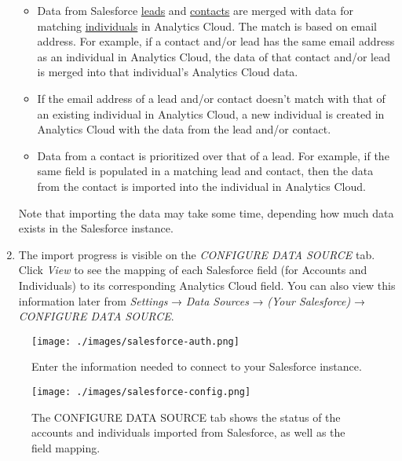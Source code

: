 \begin{enumerate}
  \begin{itemize}
  \tightlist
  \item
    Data from Salesforce
    \href{https://help.salesforce.com/articleView?id=leads_def.htm&type=5}{leads}
    and
    \href{https://help.salesforce.com/articleView?id=contacts_overview.htm&type=5}{contacts}
    are merged with data for matching
    \href{https://help.liferay.com/hc/en-us/articles/360006946171-Profiling-Individuals}{individuals}
    in Analytics Cloud. The match is based on email address. For
    example, if a contact and/or lead has the same email address as an
    individual in Analytics Cloud, the data of that contact and/or lead
    is merged into that individual's Analytics Cloud data.
  \item
    If the email address of a lead and/or contact doesn't match with
    that of an existing individual in Analytics Cloud, a new individual
    is created in Analytics Cloud with the data from the lead and/or
    contact.
  \item
    Data from a contact is prioritized over that of a lead. For example,
    if the same field is populated in a matching lead and contact, then
    the data from the contact is imported into the individual in
    Analytics Cloud.
  \end{itemize}

  Note that importing the data may take some time, depending how much
  data exists in the Salesforce instance.
\item
  The import progress is visible on the \emph{CONFIGURE DATA SOURCE}
  tab. Click \emph{View} to see the mapping of each Salesforce field
  (for Accounts and Individuals) to its corresponding Analytics Cloud
  field. You can also view this information later from \emph{Settings} →
  \emph{Data Sources} → \emph{(Your Salesforce)} → \emph{CONFIGURE DATA
  SOURCE}.
\end{enumerate}

\begin{figure}
\centering
\texttt{[image: ./images/salesforce-auth.png]}
\caption{Enter the information needed to connect to your Salesforce
instance.}
\end{figure}

\begin{figure}
\centering
\texttt{[image: ./images/salesforce-config.png]}
\caption{The CONFIGURE DATA SOURCE tab shows the status of the accounts
and individuals imported from Salesforce, as well as the field mapping.}
\end{figure}

